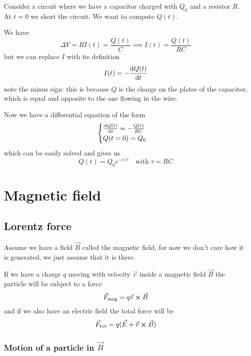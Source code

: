 \documentclass[12pt]{extarticle}
\begin{document}
Consider a circuit where we have a capacitor charged with $Q_0$ and a resistor $R$.
At $t = 0$ we short the circuit.
We want to compute $Q(t)$.

We have
\begin{equation}
	\Delta V = R I(t) = \frac{Q(t)}{C} \implies I(t) = \frac{Q(t)}{RC}
\end{equation}
but we can replace $I$ with its definition
\begin{equation}
	I(t)= -\dv{Q(t)}{t}
\end{equation}
note the minus sign: this is because $Q$ is the charge on the plates of the capacitor,
which is equal and opposite to the one flowing in the wire.

Now we have a differential equation of the form
\begin{equation}
	\begin{cases}
		\dv{Q(t)}{t} = - \frac{Q(t)}{RC} \\
		Q(t = 0) = Q_0
	\end{cases}
\end{equation}
which can be easily solved and gives us
\begin{equation}
	Q(t) = Q_0 e^{- t/\tau} \quad \text{with } \tau = RC
\end{equation}

\section{Magnetic field}

\subsection{Lorentz force}

Assume we have a field $\vec B$ called the magnetic field,
for now we don't care how it is generated, we just assume that it is there.

If we have a charge $q$ moving with velocity $\vec v$ inside a magnetic field $\vec B$
the particle will be subject to a force
\begin{equation}
	\vec F_\text{mag} = q \vec v \cross \vec B
\end{equation}
and if we also have an electric field the total force will be
\begin{equation}
	\vec F_\text{tot} = q (\vec E + \vec v \cross \vec B)
\end{equation}

\subsubsection{Motion of a particle in \texorpdfstring{$\vec B$}{B}}
\end{document}
